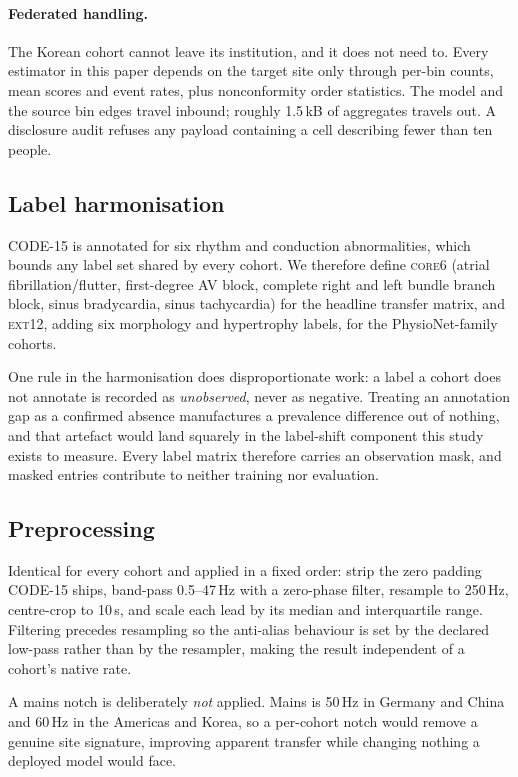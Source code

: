\paragraph{Federated handling.}
The Korean cohort cannot leave its institution, and it does not need to.  Every
estimator in this paper depends on the target site only through per-bin counts,
mean scores and event rates, plus nonconformity order statistics.  The model
and the source bin edges travel inbound; roughly 1.5\,kB of aggregates travels
out.  A disclosure audit refuses any payload containing a cell describing fewer
than ten people.

\subsection{Label harmonisation}

CODE-15 is annotated for six rhythm and conduction abnormalities, which bounds
any label set shared by every cohort.  We therefore define \textsc{core6}
(atrial fibrillation/flutter, first-degree AV block, complete right and left
bundle branch block, sinus bradycardia, sinus tachycardia) for the headline
transfer matrix, and \textsc{ext12}, adding six morphology and hypertrophy
labels, for the PhysioNet-family cohorts.

One rule in the harmonisation does disproportionate work: a label a cohort does
not annotate is recorded as \emph{unobserved}, never as negative.  Treating an
annotation gap as a confirmed absence manufactures a prevalence difference out
of nothing, and that artefact would land squarely in the label-shift component
this study exists to measure.  Every label matrix therefore carries an
observation mask, and masked entries contribute to neither training nor
evaluation.

\subsection{Preprocessing}

Identical for every cohort and applied in a fixed order: strip the zero padding
CODE-15 ships, band-pass 0.5--47\,Hz with a zero-phase filter, resample to
250\,Hz, centre-crop to 10\,s, and scale each lead by its median and
interquartile range.  Filtering precedes resampling so the anti-alias behaviour
is set by the declared low-pass rather than by the resampler, making the result
independent of a cohort's native rate.

A mains notch is deliberately \emph{not} applied.  Mains is 50\,Hz in Germany
and China and 60\,Hz in the Americas and Korea, so a per-cohort notch would
remove a genuine site signature, improving apparent transfer while changing
nothing a deployed model would face.

